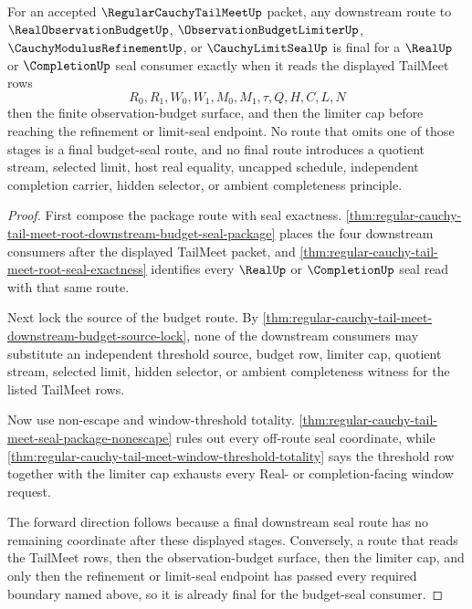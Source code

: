 \begin{theorem}
\label{thm:regular-cauchy-tail-meet-budget-seal-finality}
For an accepted $\RegularCauchyTailMeetUp$ packet, any downstream route to $\RealObservationBudgetUp$, $\ObservationBudgetLimiterUp$, $\CauchyModulusRefinementUp$, or $\CauchyLimitSealUp$ is final for a $\RealUp$ or $\CompletionUp$ seal consumer exactly when it reads the displayed TailMeet rows
$$
R_0,R_1,W_0,W_1,M_0,M_1,\tau,Q,H,C,L,N
$$
then the finite observation-budget surface, and then the limiter cap before reaching the refinement or limit-seal endpoint. No route that omits one of those stages is a final budget-seal route, and no final route introduces a quotient stream, selected limit, host real equality, uncapped schedule, independent completion carrier, hidden selector, or ambient completeness principle.
\end{theorem}
\begin{proof}
First compose the package route with seal exactness. \autoref{thm:regular-cauchy-tail-meet-root-downstream-budget-seal-package} places the four downstream consumers after the displayed TailMeet packet, and \autoref{thm:regular-cauchy-tail-meet-root-seal-exactness} identifies every $\RealUp$ or $\CompletionUp$ seal read with that same route.

Next lock the source of the budget route. By \autoref{thm:regular-cauchy-tail-meet-downstream-budget-source-lock}, none of the downstream consumers may substitute an independent threshold source, budget row, limiter cap, quotient stream, selected limit, hidden selector, or ambient completeness witness for the listed TailMeet rows.

Now use non-escape and window-threshold totality. \autoref{thm:regular-cauchy-tail-meet-seal-package-nonescape} rules out every off-route seal coordinate, while \autoref{thm:regular-cauchy-tail-meet-window-threshold-totality} says the threshold row together with the limiter cap exhausts every Real- or completion-facing window request.

The forward direction follows because a final downstream seal route has no remaining coordinate after these displayed stages. Conversely, a route that reads the TailMeet rows, then the observation-budget surface, then the limiter cap, and only then the refinement or limit-seal endpoint has passed every required boundary named above, so it is already final for the budget-seal consumer.
\end{proof}
